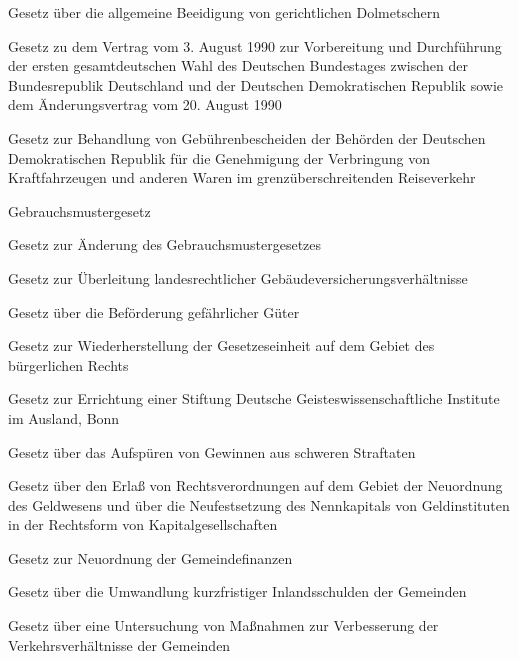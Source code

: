 \item[{GDolmG}] Gesetz über die allgemeine Beeidigung von gerichtlichen Dolmetschern

\item[{GDtWahlVDVtrG}] Gesetz zu dem Vertrag vom 3. August 1990 zur Vorbereitung und Durchführung der ersten gesamtdeutschen Wahl des Deutschen Bundestages zwischen der Bundesrepublik Deutschland und der Deutschen Demokratischen Republik sowie dem Änderungsvertrag vom 20. August 1990

\item[{GebBeschG}] Gesetz zur Behandlung von Gebührenbescheiden der Behörden der Deutschen Demokratischen Republik für die Genehmigung der Verbringung von Kraftfahrzeugen und anderen Waren im grenzüberschreitenden Reiseverkehr

\item[{GebrMG}] Gebrauchsmustergesetz

\item[{GebrMGÄndG}] Gesetz zur Änderung des Gebrauchsmustergesetzes

\item[{GebVersÜblG}] Gesetz zur Überleitung landesrechtlicher Gebäudeversicherungsverhältnisse

\item[{GefahrgutG}] Gesetz über die Beförderung gefährlicher Güter

\item[{GEinhG}] Gesetz zur Wiederherstellung der Gesetzeseinheit auf dem Gebiet des bürgerlichen Rechts

\item[{GeistwStiftG}] Gesetz zur Errichtung einer Stiftung Deutsche Geisteswissenschaftliche Institute im Ausland, Bonn

\item[{GeldwG}] Gesetz über das Aufspüren von Gewinnen aus schweren Straftaten

\item[{GeldWNOG}] Gesetz über den Erlaß von Rechtsverordnungen auf dem Gebiet der Neuordnung des Geldwesens und über die Neufestsetzung des Nennkapitals von Geldinstituten in der Rechtsform von Kapitalgesellschaften

\item[{GemFinRefG}] Gesetz zur Neuordnung der Gemeindefinanzen

\item[{GemUSchuldG}] Gesetz über die Umwandlung kurzfristiger Inlandsschulden der Gemeinden

\item[{GemVerkVerbG}] Gesetz über eine Untersuchung von Maßnahmen zur Verbesserung der Verkehrsverhältnisse der Gemeinden

